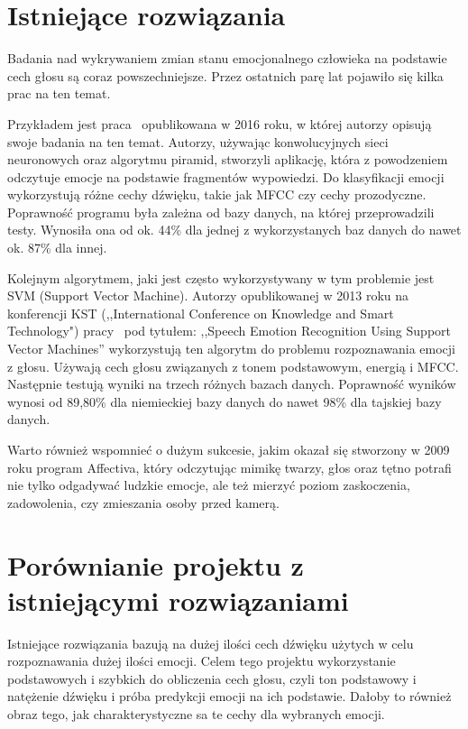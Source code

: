 \documentclass[declaration,shortabstract]{iithesis}
\begin{document}
\section{Istniejące rozwiązania}
Badania nad wykrywaniem zmian stanu emocjonalnego człowieka na podstawie cech głosu są coraz powszechniejsze. Przez ostatnich parę lat pojawiło się kilka prac na ten temat. 

Przykładem jest praca~\cite{sernn} opublikowana w 2016 roku, w której autorzy opisują swoje badania na ten temat. Autorzy, używając konwolucyjnych sieci neuronowych oraz algorytmu piramid, stworzyli aplikację, która z powodzeniem odczytuje emocje na podstawie fragmentów wypowiedzi. Do klasyfikacji emocji wykorzystują różne cechy dźwięku, takie jak MFCC czy cechy prozodyczne. Poprawność programu była zależna od bazy danych, na której przeprowadzili testy. Wynosiła ona od ok. 44\% dla jednej z wykorzystanych baz danych do nawet ok. 87\% dla innej.

Kolejnym algorytmem, jaki jest często wykorzystywany w tym problemie jest SVM (Support Vector Machine). Autorzy opublikowanej w 2013 roku na konferencji KST (,,International Conference on Knowledge and Smart Technology") pracy~\cite{svn} pod tytułem: ,,Speech Emotion Recognition Using Support Vector Machines” wykorzystują ten algorytm do problemu rozpoznawania emocji z głosu. Używają cech głosu związanych z tonem podstawowym, energią i MFCC. Następnie testują wyniki na trzech różnych bazach danych. Poprawność wyników wynosi od 89,80\% dla niemieckiej bazy danych do nawet 98\% dla tajskiej bazy danych.

Warto również wspomnieć o dużym sukcesie, jakim okazał się stworzony w 2009 roku program Affectiva, który odczytując mimikę twarzy, głos oraz tętno potrafi nie tylko odgadywać ludzkie emocje, ale też mierzyć poziom zaskoczenia, zadowolenia, czy zmieszania osoby przed kamerą.

\section{Porównianie projektu z istniejącymi rozwiązaniami}
Istniejące rozwiązania bazują na dużej ilości cech dźwięku użytych w celu rozpoznawania dużej ilości emocji.
Celem tego projektu wykorzystanie podstawowych i szybkich do obliczenia cech głosu, czyli ton podstawowy i natężenie dźwięku i próba predykcji emocji na ich podstawie. Dałoby to również obraz tego, jak charakterystyczne sa te cechy dla wybranych emocji.

\let\cleardoublepage\clearpage
\end{document}
